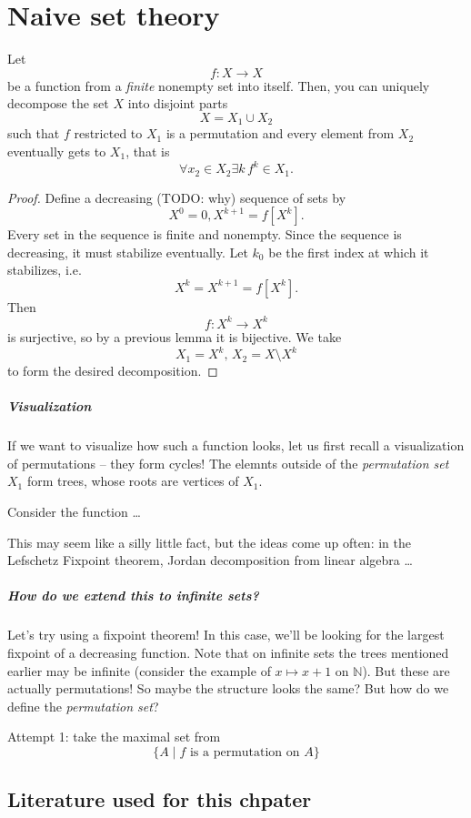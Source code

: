 \chapter{Naive set theory}

\begin{lemma}
    Let
    \[
        f: X \to X
    \]
    be a function from a \emph{finite} nonempty set into itself. Then, you can uniquely decompose the set \( X \) into disjoint parts
    \[
        X = X_1 \cup X_2
    \]
    such that \( f \) restricted to \( X_1 \) is a permutation and every element from \( X_2 \) eventually gets to \( X_1 \), that is
    \[
        \forall x_2 \in X_2 \exists k \, f^k \in X_1.
    \]
\end{lemma}

\begin{proof}

    Define a decreasing (TODO: why) sequence of sets by
    \[
        X^0 = 0, X^{k+1} = f[X^k].
    \]
    Every set in the sequence is finite and nonempty. Since the sequence is decreasing, it must stabilize eventually. Let \( k_0 \) be the first index at which it stabilizes, i.e.
    \[
        X^k = X^{k+1} = f[X^k].
    \]
    Then
    \[
        f: X^k \to X^k
    \]
    is surjective, so by a previous lemma it is bijective. We take
    \[
        X_1 = X^k,\,X_2 = X \setminus X^k
    \]
    to form the desired decomposition.

\end{proof}

\paragraph{Visualization} If we want to visualize how such a function looks, let us first recall a visualization of permutations -- they form cycles! The elemnts outside of the \emph{permutation set} \(X_1\) form trees, whose roots are vertices of \( X_1 \).

\begin{example}
    Consider the function \ldots
\end{example}

This may seem like a silly little fact, but the ideas come up often: in the Lefschetz Fixpoint theorem, Jordan decomposition from linear algebra \ldots

\paragraph{How do we extend this to infinite sets?} Let's try using a fixpoint theorem! In this case, we'll be looking for the largest fixpoint of a decreasing function.
Note that on infinite sets the trees mentioned earlier may be infinite (consider the example of \( x \mapsto x+1 \) on \(\mathbb{N}\)). But these are actually permutations! So maybe the structure looks the same? But how do we define the \emph{permutation set}?

Attempt 1: take the maximal set from
\[
    \{ A \mid f \text{ is a permutation on } A \}
\]

\section{Literature used for this chpater}
